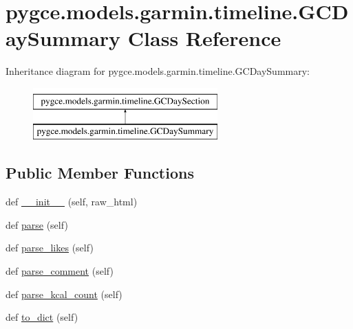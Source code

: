 \hypertarget{classpygce_1_1models_1_1garmin_1_1timeline_1_1_g_c_day_summary}{}\section{pygce.\+models.\+garmin.\+timeline.\+G\+C\+Day\+Summary Class Reference}
\label{classpygce_1_1models_1_1garmin_1_1timeline_1_1_g_c_day_summary}
Inheritance diagram for pygce.\+models.\+garmin.\+timeline.\+G\+C\+Day\+Summary\+:\begin{figure}[H]
\begin{center}
\leavevmode
\includegraphics[height=2.000000cm]{classpygce_1_1models_1_1garmin_1_1timeline_1_1_g_c_day_summary}
\end{center}
\end{figure}
\subsection*{Public Member Functions}
\begin{DoxyCompactItemize}
\item 
def \hyperlink{classpygce_1_1models_1_1garmin_1_1timeline_1_1_g_c_day_summary_a9af14ec017803981a9b6047877d92be7}{\+\_\+\+\_\+init\+\_\+\+\_\+} (self, raw\+\_\+html)
\item 
def \hyperlink{classpygce_1_1models_1_1garmin_1_1timeline_1_1_g_c_day_summary_ab7b302fdc532d60ac846230bc0a28150}{parse} (self)
\item 
def \hyperlink{classpygce_1_1models_1_1garmin_1_1timeline_1_1_g_c_day_summary_a6b4f9c47531f9a6ed2f82751153a6611}{parse\+\_\+likes} (self)
\item 
def \hyperlink{classpygce_1_1models_1_1garmin_1_1timeline_1_1_g_c_day_summary_adb9b8c1210354666d6a137d3e1cc50c4}{parse\+\_\+comment} (self)
\item 
def \hyperlink{classpygce_1_1models_1_1garmin_1_1timeline_1_1_g_c_day_summary_a96e573903735f0ed37698d79d43116f0}{parse\+\_\+kcal\+\_\+count} (self)
\item 
def \hyperlink{classpygce_1_1models_1_1garmin_1_1timeline_1_1_g_c_day_summary_a65d756c22031bee3eebcef9e1df1040b}{to\+\_\+dict} (self)
\end{DoxyCompactItemize}
